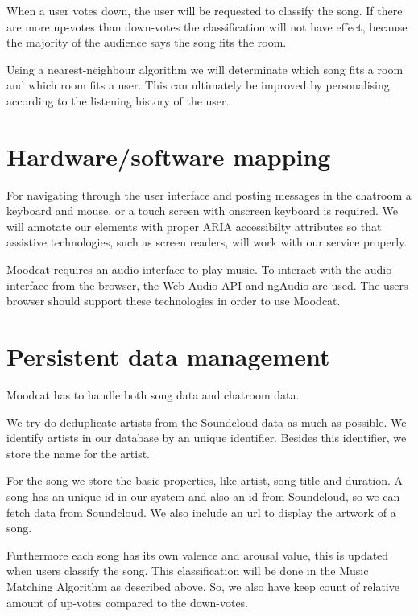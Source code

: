 When a user votes down, the user will be requested to classify the song.
If there are more up-votes than down-votes the classification will not have effect, because the majority of the audience says the song fits the room.

Using a nearest-neighbour algorithm we will determinate which song fits a room and which room fits a user.
This can ultimately be improved by personalising according to the listening history of the user.

\section{Hardware/software mapping}
For navigating through the user interface and posting messages in the chatroom a keyboard and mouse, or a touch screen with onscreen keyboard is required.
We will annotate our elements with proper \Gls{ARIA} accessibilty attributes so that assistive technologies, such as screen readers, will work with our service properly.

\par
Moodcat requires an audio interface to play music.
To interact with the audio interface from the browser, the Web Audio API\cite{WebAudioAPI} and ngAudio\cite{ngAudio} are used.
The users browser should support these technologies in order to use Moodcat.

\section{Persistent data management}
Moodcat has to handle both song data and chatroom data.

\par
We try do deduplicate artists from the Soundcloud data as much as possible. We identify artists in our database by an unique identifier. Besides this identifier, we store the name for the artist.

\par
For the song we store the basic properties, like artist, song title and duration.
A song has an unique id in our system and also an id from \gls{Soundcloud}, so we can fetch data from Soundcloud.
We also include an url to display the artwork of a song.

Furthermore each song has its own \gls{valence} and \gls{arousal} value, this is updated when users classify the song.
This classification will be done in the Music Matching Algorithm as described above. So, we also have keep count of relative amount of up-votes compared to the down-votes.

